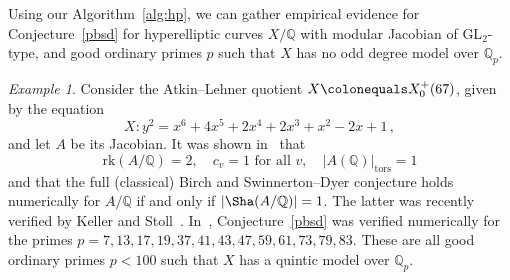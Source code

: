 \documentclass[11pt, a4paper]{amsart}
\newcommand{\Q}{\mathbb{Q}}
\theoremstyle{remark}
\newtheorem{example}[theorem]{Example}
\numberwithin{equation}{section}
\begin{document}
Using our Algorithm~\ref{alg:hp}, we can gather empirical evidence for 
Conjecture~\ref{pbsd} for hyperelliptic curves $X/\Q$ with modular
Jacobian of GL$_2$-type, and good ordinary primes $p$ such that $X$ has no odd degree model
over $\Q_p$. 

\begin{example}\label{E:67bsd}
 Consider the Atkin--Lehner quotient $X\colonequals X_0^+(67)$,
given by the equation 
  \begin{equation*}\label{67eqn}
X\colon y^2 = x^6+4x^5+2x^4+2x^3+x^2-2x+1\,,
  \end{equation*}
and let $A$ be its Jacobian.
  It was shown in~\cite{FLSSSW01} that
  \begin{equation}\label{tametc}
    \mathrm{rk}(A/\Q)=2,\quad c_v=1\text{ for all }v,\quad
    |A(\Q)|_{\mathrm{tors}}=1
  \end{equation}
 and that the full (classical) Birch and Swinnerton--Dyer conjecture
holds numerically for $A/\Q$  if and only if $|\Sha(A/\Q)|=1$. The latter was recently 
verified by Keller and Stoll~\cite{KS22, KS}.
In~\cite{BMS16}, Conjecture~\ref{pbsd} was verified numerically for the
primes $p=7,13,17,19,37,41,43,47,59,61,73,79,83$. These are all good
ordinary primes $p<100$ such that $X$ has a quintic model over $\Q_p$.


\end{example}
\end{document}
